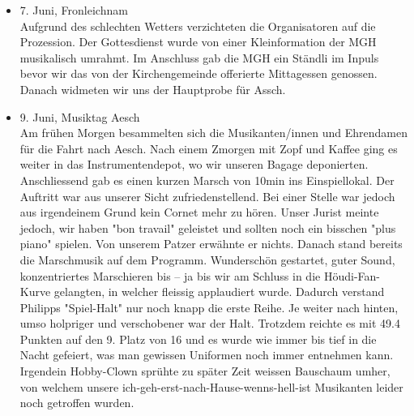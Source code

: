 \begin{history}
\begin{itemize}
            \item 7. Juni, Fronleichnam\\
                  Aufgrund des schlechten Wetters verzichteten die Organisatoren auf die
                  Prozession. Der Gottesdienst wurde von einer Kleinformation der MGH
                  musikalisch umrahmt. Im Anschluss gab die MGH ein Ständli im Inpuls
                  bevor wir das von der Kirchengemeinde offerierte Mittagessen genossen.
                  Danach widmeten wir uns der Hauptprobe für Assch.

            \item 9. Juni, Musiktag Aesch\\
                  Am frühen Morgen besammelten sich die Musikanten/innen und Ehrendamen
                  für die Fahrt nach Aesch. Nach einem Zmorgen mit Zopf und Kaffee ging es
                  weiter in das Instrumentendepot, wo wir unseren Bagage deponierten.
                  Anschliessend gab es einen kurzen Marsch von 10min ins Einspiellokal.
                  Der Auftritt war aus unserer Sicht zufriedenstellend. Bei einer Stelle
                  war jedoch aus irgendeinem Grund kein Cornet mehr zu hören. Unser Jurist
                  meinte jedoch, wir haben "bon travail" geleistet und sollten noch ein
                  bisschen "plus piano" spielen. Von unserem Patzer erwähnte er nichts.
                  Danach stand bereits die Marschmusik auf dem Programm. Wunderschön
                  gestartet, guter Sound, konzentriertes Marschieren bis -- ja bis wir am
                  Schluss in die Höudi-Fan-Kurve gelangten, in welcher fleissig
                  applaudiert wurde. Dadurch verstand Philipps "Spiel-Halt" nur noch knapp
                  die erste Reihe. Je weiter nach hinten, umso holpriger und verschobener
                  war der Halt. Trotzdem reichte es mit 49.4 Punkten auf den 9. Platz von
                  16 und es wurde wie immer bis tief in die Nacht gefeiert, was man
                  gewissen Uniformen noch immer entnehmen kann. Irgendein Hobby-Clown
                  sprühte zu später Zeit weissen Bauschaum umher, von welchem unsere
                  ich-geh-erst-nach-Hause-wenns-hell-ist Musikanten leider noch getroffen
                  wurden.


\end{itemize}
\end{history}
